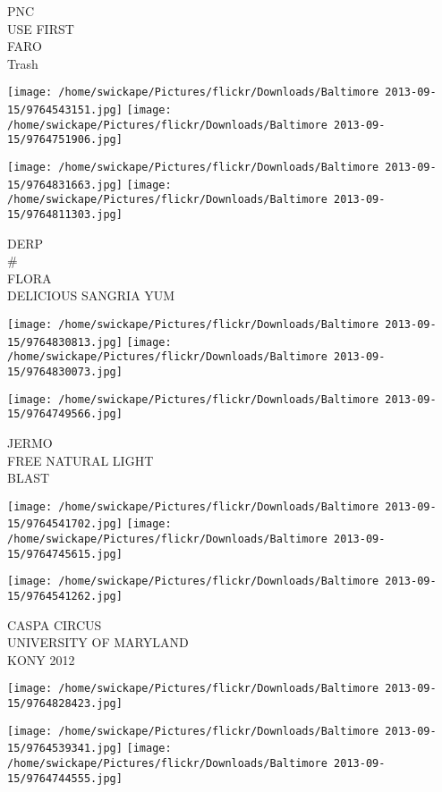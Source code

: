 \documentclass[10pt,letterpaper]{article}
\begin{document}
PNC\\
USE FIRST\\
FARO\\
Trash
\pagebreak

\texttt{[image: /home/swickape/Pictures/flickr/Downloads/Baltimore 2013-09-15/9764543151.jpg]}
\texttt{[image: /home/swickape/Pictures/flickr/Downloads/Baltimore 2013-09-15/9764751906.jpg]}

\texttt{[image: /home/swickape/Pictures/flickr/Downloads/Baltimore 2013-09-15/9764831663.jpg]}
\texttt{[image: /home/swickape/Pictures/flickr/Downloads/Baltimore 2013-09-15/9764811303.jpg]}

DERP\\
\#\\
FLORA\\
DELICIOUS SANGRIA YUM
\pagebreak

\texttt{[image: /home/swickape/Pictures/flickr/Downloads/Baltimore 2013-09-15/9764830813.jpg]}
\texttt{[image: /home/swickape/Pictures/flickr/Downloads/Baltimore 2013-09-15/9764830073.jpg]}

\vspace{0.25in}
\texttt{[image: /home/swickape/Pictures/flickr/Downloads/Baltimore 2013-09-15/9764749566.jpg]}

JERMO\\
FREE NATURAL LIGHT\\
BLAST
\pagebreak

\texttt{[image: /home/swickape/Pictures/flickr/Downloads/Baltimore 2013-09-15/9764541702.jpg]}
\texttt{[image: /home/swickape/Pictures/flickr/Downloads/Baltimore 2013-09-15/9764745615.jpg]}

\texttt{[image: /home/swickape/Pictures/flickr/Downloads/Baltimore 2013-09-15/9764541262.jpg]}

CASPA CIRCUS\\
UNIVERSITY OF MARYLAND\\
KONY 2012
\pagebreak

\texttt{[image: /home/swickape/Pictures/flickr/Downloads/Baltimore 2013-09-15/9764828423.jpg]}

\vspace{0.25in}
\texttt{[image: /home/swickape/Pictures/flickr/Downloads/Baltimore 2013-09-15/9764539341.jpg]}
\texttt{[image: /home/swickape/Pictures/flickr/Downloads/Baltimore 2013-09-15/9764744555.jpg]}
\end{document}
